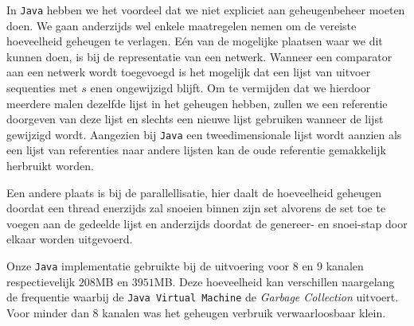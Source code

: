 \documentclass{article}
\begin{document}
In \texttt{Java} hebben we het voordeel dat we niet expliciet aan geheugenbeheer moeten doen.
We gaan anderzijds wel enkele maatregelen nemen om de vereiste hoeveelheid geheugen te verlagen.
E\'en van de mogelijke plaatsen waar we dit kunnen doen, is bij de representatie van een netwerk.
Wanneer een comparator aan een netwerk wordt toegevoegd is het mogelijk dat een lijst van uitvoer sequenties met $s$ enen ongewijzigd blijft.
Om te vermijden dat we hierdoor meerdere malen dezelfde lijst in het geheugen hebben, zullen we een referentie doorgeven van deze lijst en slechts een nieuwe lijst gebruiken wanneer de lijst gewijzigd wordt.
Aangezien bij \texttt{Java} een tweedimensionale lijst wordt aanzien als een lijst van referenties naar andere lijsten kan de oude referentie gemakkelijk herbruikt worden. 

Een andere plaats is bij de parallellisatie, hier daalt de hoeveelheid geheugen doordat een thread enerzijds zal snoeien binnen zijn set alvorens de set toe te voegen aan de gedeelde lijst en anderzijds doordat de genereer- en snoei-stap door elkaar worden uitgevoerd.

Onze \texttt{Java} implementatie gebruikte bij de uitvoering voor $8$ en $9$ kanalen respectievelijk $208$MB en $3951$MB.
Deze hoeveelheid kan verschillen naargelang de frequentie waarbij de \texttt{Java Virtual Machine} de \textit{Garbage Collection} uitvoert.
Voor minder dan $8$ kanalen was het geheugen verbruik verwaarloosbaar klein.
\end{document}
